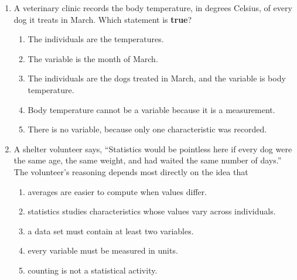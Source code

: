 \begin{enumerate}[leftmargin=1.9em, itemsep=0.14in]
  \boxguard[10]
  \item A veterinary clinic records the body temperature, in degrees Celsius, of every dog it
        treats in March. Which statement is \textbf{true}?
        \begin{enumerate}[label=\textbf{(\Alph*)}, leftmargin=2.2em, itemsep=3pt]
          \item The individuals are the temperatures.
          \item The variable is the month of March.
          \item The individuals are the dogs treated in March, and the variable is body temperature.
                \quad {}
          \item Body temperature cannot be a variable because it is a measurement.
          \item There is no variable, because only one characteristic was recorded.
                \hfill{}
        \end{enumerate}

  \item A shelter volunteer says, ``Statistics would be pointless here if every dog were the
        same age, the same weight, and had waited the same number of days.'' The volunteer's
        reasoning depends most directly on the idea that
        \begin{enumerate}[label=\textbf{(\Alph*)}, leftmargin=2.2em, itemsep=3pt]
          \item averages are easier to compute when values differ.
          \item statistics studies characteristics whose values vary across individuals.
                \quad {}
          \item a data set must contain at least two variables.
          \item every variable must be measured in units.
          \item counting is not a statistical activity.
                \hfill{}
        \end{enumerate}

\end{enumerate}

\vspace{0.14in}

